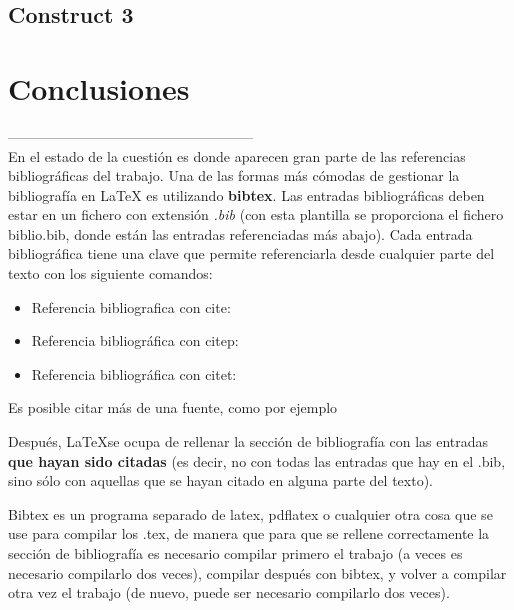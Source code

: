 \subsection{Construct 3}
\section{Conclusiones}
-----------------------------------------------------\\
En el estado de la cuestión es donde aparecen gran parte de las referencias bibliográficas del trabajo. Una de las formas más cómodas de gestionar la bibliografía en {\LaTeX} es utilizando \textbf{bibtex}. Las entradas bibliográficas deben estar en un fichero con extensión \textit{.bib} (con esta plantilla se proporciona el fichero biblio.bib, donde están las entradas referenciadas más abajo). Cada entrada bibliográfica tiene una clave que permite referenciarla desde cualquier parte del texto con los siguiente comandos:

\begin{itemize}
\item Referencia bibliografica con cite: \cite{ldesc2e}
\item Referencia bibliográfica con citep: \citep{notsoshort}
\item Referencia bibliográfica con citet: \citet{latexAPrimer}
\end{itemize}

Es posible citar más de una fuente, como por ejemplo \citep{latexCompanion,LaTeXLamport,texKnuth}

Después, \LaTeX se ocupa de rellenar la sección de bibliografía con las entradas \textbf{que hayan sido citadas} (es decir, no con todas las entradas que hay en el .bib, sino sólo con aquellas que se hayan citado en alguna parte del texto).

Bibtex es un programa separado de latex, pdflatex o cualquier otra cosa que se use para compilar los .tex, de manera que para que se rellene correctamente la sección de bibliografía es necesario compilar primero el trabajo (a veces es necesario compilarlo dos veces), compilar después con bibtex, y volver a compilar otra vez el trabajo (de nuevo, puede ser necesario compilarlo dos veces). 
